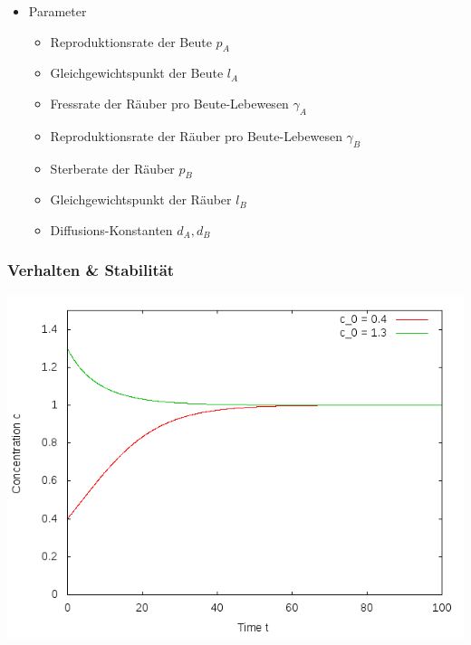 \documentclass[12pt]{beamer}
\begin{document}
\begin{frame}
\begin{itemize}
      \item Parameter
      \begin{itemize}
	  \item Reproduktionsrate der Beute $p_A$
	  \item Gleichgewichtspunkt der Beute $l_A$
	  \item Fressrate der Räuber pro Beute-Lebewesen $\gamma_A$
	  \item Reproduktionsrate der Räuber pro Beute-Lebewesen $\gamma_B$
	  \item Sterberate der Räuber $p_B$
	  \item Gleichgewichtspunkt der Räuber $l_B$
	  \item Diffusions-Konstanten $d_A, d_B$
      \end{itemize}
    
      \end{itemize}
    \end{frame}
    
    \begin{frame}
    \frametitle{Verhalten \& Stabilität}
    \includegraphics[scale=0.5]{Bilder/n1_anfangsbedingungen.png}
    \end{frame}
    
\end{document}
